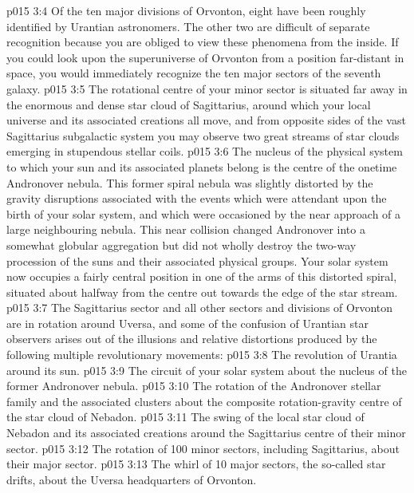 \vs p015 3:4 \pc Of the ten major divisions of Orvonton, eight have been roughly identified by Urantian astronomers. The other two are difficult of separate recognition because you are obliged to view these phenomena from the inside. If you could look upon the superuniverse of Orvonton from a position far\hyp{}distant in space, you would immediately recognize the ten major sectors of the seventh galaxy.
\vs p015 3:5 The rotational centre of your minor sector is situated far away in the enormous and dense star cloud of Sagittarius, around which your local universe and its associated creations all move, and from opposite sides of the vast Sagittarius subgalactic system you may observe two great streams of star clouds emerging in stupendous stellar coils.
\vs p015 3:6 The nucleus of the physical system to which your sun and its associated planets belong is the centre of the onetime Andronover nebula. This former spiral nebula was slightly distorted by the gravity disruptions associated with the events which were attendant upon the birth of your solar system, and which were occasioned by the near approach of a large neighbouring nebula. This near collision changed Andronover into a somewhat globular aggregation but did not wholly destroy the two\hyp{}way procession of the suns and their associated physical groups. Your solar system now occupies a fairly central position in one of the arms of this distorted spiral, situated about halfway from the centre out towards the edge of the star stream.
\vs p015 3:7 \pc The Sagittarius sector and all other sectors and divisions of Orvonton are in rotation around Uversa, and some of the confusion of Urantian star observers arises out of the illusions and relative distortions produced by the following multiple revolutionary movements:
\vs p015 3:8 \bibnobreakspace The revolution of Urantia around its sun.
\vs p015 3:9 \bibnobreakspace The circuit of your solar system about the nucleus of the former Andronover nebula.
\vs p015 3:10 \bibnobreakspace The rotation of the Andronover stellar family and the associated clusters about the composite rotation\hyp{}gravity centre of the star cloud of Nebadon.
\vs p015 3:11 \bibnobreakspace The swing of the local star cloud of Nebadon and its associated creations around the Sagittarius centre of their minor sector.
\vs p015 3:12 \bibnobreakspace The rotation of 100 minor sectors, including Sagittarius, about their major sector.
\vs p015 3:13 \bibnobreakspace The whirl of 10 major sectors, the so\hyp{}called star drifts, about the Uversa headquarters of Orvonton.
